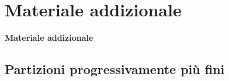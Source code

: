 \documentclass[handout]{beamer}%
\providecommand{\1}{\mathbf{1}}
\begin{document}
\section{Materiale addizionale}%

\begin{frame}%



\vfill


\begin{center}
\textcolor{light-blue}{{\Large \textbf{Materiale addizionale}}}


\end{center}

\vfill
%

\transboxout
\end{frame}%




\subsection{Partizioni progressivamente pi\`{u} fini}%
\end{document}
